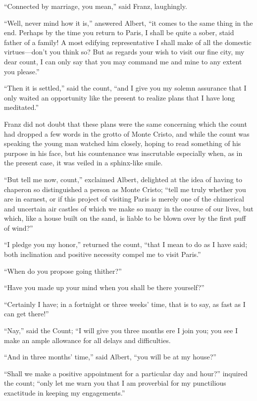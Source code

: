 “Connected by marriage, you mean,” said Franz, laughingly.

“Well, never mind how it is,” answered Albert, “it comes to the same
thing in the end. Perhaps by the time you return to Paris, I shall be
quite a sober, staid father of a family! A most edifying representative
I shall make of all the domestic virtues—don’t you think so? But as
regards your wish to visit our fine city, my dear count, I can only say
that you may command me and mine to any extent you please.”

“Then it is settled,” said the count, “and I give you my solemn
assurance that I only waited an opportunity like the present to realize
plans that I have long meditated.”

Franz did not doubt that these plans were the same concerning which the
count had dropped a few words in the grotto of Monte Cristo, and while
the count was speaking the young man watched him closely, hoping to
read something of his purpose in his face, but his countenance was
inscrutable especially when, as in the present case, it was veiled in a
sphinx-like smile.

“But tell me now, count,” exclaimed Albert, delighted at the idea of
having to chaperon so distinguished a person as Monte Cristo; “tell me
truly whether you are in earnest, or if this project of visiting Paris
is merely one of the chimerical and uncertain air castles of which we
make so many in the course of our lives, but which, like a house built
on the sand, is liable to be blown over by the first puff of wind?”

“I pledge you my honor,” returned the count, “that I mean to do as I
have said; both inclination and positive necessity compel me to visit
Paris.”

“When do you propose going thither?”

“Have you made up your mind when you shall be there yourself?”

“Certainly I have; in a fortnight or three weeks’ time, that is to say,
as fast as I can get there!”

“Nay,” said the Count; “I will give you three months ere I join you;
you see I make an ample allowance for all delays and difficulties.

“And in three months’ time,” said Albert, “you will be at my house?”

“Shall we make a positive appointment for a particular day and hour?”
inquired the count; “only let me warn you that I am proverbial for my
punctilious exactitude in keeping my engagements.”

